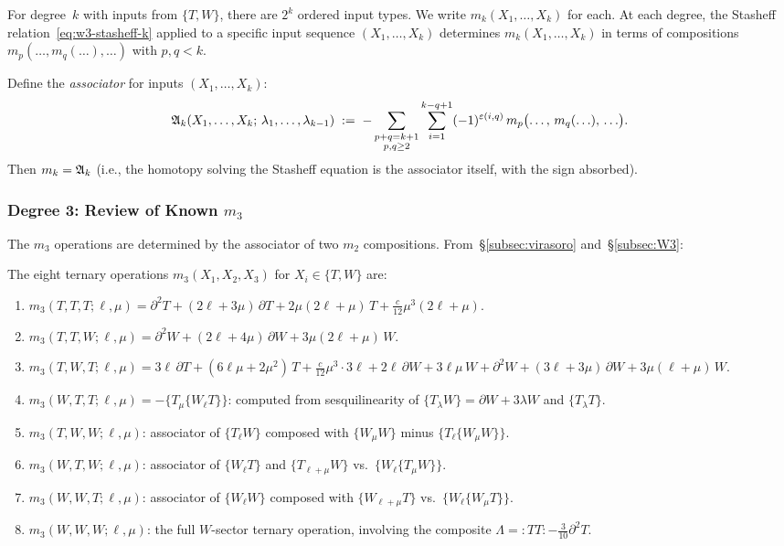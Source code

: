 For degree~$k$ with inputs from $\{T, W\}$, there are $2^k$ ordered
input types. We write $m_k(X_1, \ldots, X_k)$ for each. At each
degree, the Stasheff relation~\eqref{eq:w3-stasheff-k} applied to a
specific input sequence $(X_1, \ldots, X_k)$ determines $m_k(X_1,
\ldots, X_k)$ in terms of compositions $m_p(\ldots, m_q(\ldots),
\ldots)$ with $p, q < k$.

Define the \emph{associator} for inputs $(X_1, \ldots, X_k)$:
\begin{equation}
\label{eq:w3-associator-def}
\mathfrak{A}_k(X_1, \ldots, X_k;\, \lambda_1, \ldots, \lambda_{k-1})
\;:=\;
-\sum_{\substack{p+q = k+1 \\ p,q \ge 2}}
\sum_{i=1}^{k-q+1}
(-1)^{\varepsilon(i,q)}\,
m_p\bigl(\ldots,\, m_q(\ldots),\, \ldots\bigr).
\end{equation}
Then $m_k = \mathfrak{A}_k$ (i.e., the homotopy solving the Stasheff
equation is the associator itself, with the sign absorbed).

\subsubsection{Degree 3: Review of Known $m_3$}

The $m_3$ operations are determined by the associator of two $m_2$
compositions. From~\S\ref{subsec:virasoro} and~\S\ref{subsec:W3}:

\begin{proposition}
\label{prop:w3-all-m3}
The eight ternary operations $m_3(X_1, X_2, X_3)$ for $X_i \in \{T,W\}$ are:
\begin{enumerate}
\item $m_3(T,T,T;\ell,\mu) = \partial^2 T + (2\ell + 3\mu)\,\partial T
 + 2\mu(2\ell + \mu)\, T + \tfrac{c}{12}\mu^3(2\ell + \mu)$.
\item $m_3(T,T,W;\ell,\mu) = \partial^2 W + (2\ell + 4\mu)\,\partial W
 + 3\mu(2\ell + \mu)\, W$.
\item $m_3(T,W,T;\ell,\mu) = 3\ell\,\partial T + (6\ell\mu + 2\mu^2)\, T
 + \tfrac{c}{12}\mu^3 \cdot 3\ell + 2\ell\,\partial W + 3\ell\mu\, W
 + \partial^2 W + (3\ell + 3\mu)\,\partial W + 3\mu(\ell + \mu)\, W$.
\item $m_3(W,T,T;\ell,\mu) = -\{T_\mu\{W_\ell T\}\}$:
 computed from sesquilinearity of $\{T_\lambda W\} = \partial W + 3\lambda W$
 and $\{T_\lambda T\}$.
\item $m_3(T,W,W;\ell,\mu)$: associator of $\{T_\ell W\}$ composed
 with $\{W_\mu W\}$ minus $\{T_\ell \{W_\mu W\}\}$.
\item $m_3(W,T,W;\ell,\mu)$: associator of $\{W_\ell T\}$ and
 $\{T_{\ell+\mu} W\}$ vs.\ $\{W_\ell \{T_\mu W\}\}$.
\item $m_3(W,W,T;\ell,\mu)$: associator of $\{W_\ell W\}$ composed
 with $\{W_{\ell+\mu} T\}$ vs.\ $\{W_\ell \{W_\mu T\}\}$.
\item $m_3(W,W,W;\ell,\mu)$: the full $W$-sector ternary operation,
 involving the composite $\Lambda = {:}TT{:} - \tfrac{3}{10}\partial^2 T$.
\end{enumerate}
\end{proposition}

